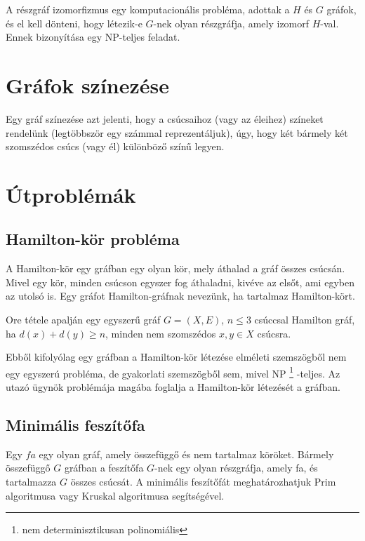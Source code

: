 A részgráf izomorfizmus egy komputacionális probléma, adottak a \(H\) és \(G\) gráfok, és el kell dönteni, hogy létezik-e \(G\)-nek olyan részgráfja, amely izomorf \(H\)-val. Ennek bizonyítása egy NP-teljes feladat.

\section{Gráfok színezése}\label{sec:ALAP:adatelem}

Egy gráf színezése azt jelenti, hogy a csúcsaihoz (vagy az éleihez) színeket rendelünk (legtöbbször egy számmal reprezentáljuk), úgy, hogy két bármely két szomszédos csúcs (vagy él) különböző színű legyen.

\section{Útproblémák}\label{sec:ALAP:adatelem}

\subsection{Hamilton-kör probléma}

A Hamilton-kör egy gráfban egy olyan kör, mely áthalad a gráf összes csúcsán. Mivel egy kör, minden csúcson egyszer fog áthaladni, kivéve az elsőt, ami egyben az utolsó is. Egy gráfot Hamilton-gráfnak nevezünk, ha tartalmaz Hamilton-kört.

Ore tétele apalján egy egyszerű gráf \(G = (X,E)\), \(n \leq 3\) csúccsal Hamilton gráf, ha \(d(x) + d(y)  \geq n\), minden nem szomszédos \(x,y \in X\) csúcsra.

Ebből kifolyólag egy gráfban a Hamilton-kör létezése elméleti szemszögből nem egy egyszerú probléma, de gyakorlati szemszögből sem, mivel NP%
\footnote{ %
	nem determinisztikusan polinomiális
}  %
-teljes. Az utazó ügynök problémája magába foglalja a Hamilton-kör létezését a gráfban.

\subsection{Minimális feszítőfa}

Egy \(fa\) egy olyan gráf, amely összefüggő és nem tartalmaz köröket. Bármely összefüggő \(G\) gráfban a feszítőfa \(G\)-nek egy olyan részgráfja, amely fa, és tartalmazza \(G\) összes csúcsát. A minimális feszítőfát meghatározhatjuk Prim algoritmusa vagy Kruskal algoritmusa segítségével.

